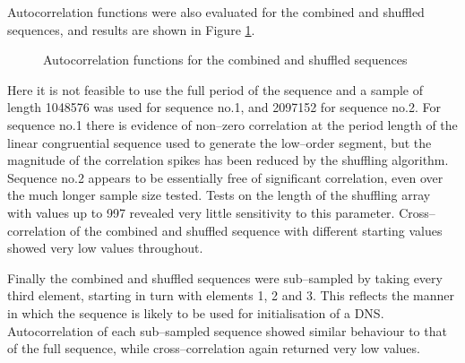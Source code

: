 \documentclass[dvips]{article}
\begin{document}
Autocorrelation functions were also evaluated for the combined and shuffled
sequences, and results are shown in Figure \ref{figautocombo}.
\begin{figure}[htbp]
\begin{center}
\quad
{}\quad
\caption{Autocorrelation functions for the combined and shuffled sequences}
\label{figautocombo}
\end{center}
\end{figure}
Here it is not feasible to use the full period of the sequence and a sample of
length 1048576 was used for sequence no.1, and 2097152 for sequence
no.2.  For sequence no.1 there is evidence of non--zero correlation at the
period length of the
linear congruential sequence used to generate the low--order segment, but
the magnitude of the correlation spikes has been reduced by the shuffling
algorithm.  Sequence no.2 appears to be essentially free of significant
correlation, even over the much longer sample size tested.  Tests on the
length of the shuffling array with values up to 997 revealed very little
sensitivity to this parameter.  Cross--correlation of the combined and shuffled
sequence with different starting values showed very low values throughout.

Finally the combined and shuffled sequences were sub--sampled by taking
every third element, starting in turn with elements 1, 2 and 3.  This
reflects the manner in which the sequence is likely to be used for
initialisation of a DNS.
Autocorrelation of each sub--sampled sequence showed similar behaviour to
that of the full sequence, while cross--correlation again returned very
low values.
 
\end{document}
